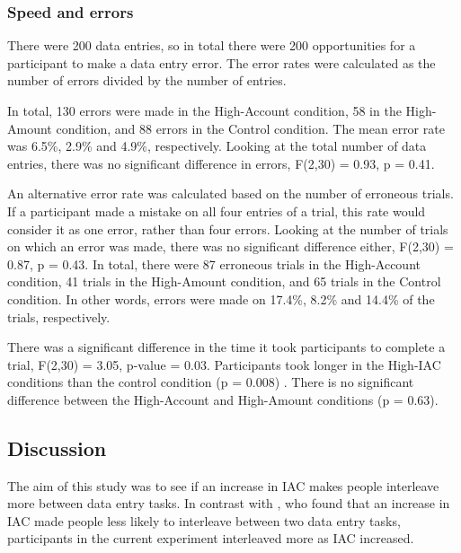\subsubsection{Speed and errors}
There were 200 data entries, so in total there were 200 opportunities for a participant to make a data entry error. The error rates were calculated as the number of errors divided by the number of entries. 

In total, 130 errors were made in the High-Account condition, 58 in the High-Amount condition, and 88 errors in the Control condition. The mean error rate was 6.5\%, 2.9\% and 4.9\%, respectively. 
Looking at the total number of data entries, there was no significant difference in errors, F(2,30) = 0.93, p = 0.41.

An alternative error rate was calculated based on the number of erroneous trials. If a participant made a mistake on all four entries of a trial, this rate would consider it as one error, rather than four errors. Looking at the number of trials on which an error was made, there was no significant difference either, F(2,30) = 0.87, p = 0.43. In total, there were 87 erroneous trials in the High-Account condition, 41 trials in the High-Amount condition, and 65 trials in the Control condition. In other words, errors were made on 17.4\%, 8.2\% and 14.4\% of the trials, respectively. 

There was a significant difference in the time it took participants to complete a trial, F(2,30) = 3.05, p-value = 0.03. Participants took longer in the High-IAC conditions than the control condition  (p = 0.008) . There is no significant difference between the High-Account and High-Amount conditions (p = 0.63).

\subsection{Discussion}
The aim of this study was to see if an increase in IAC makes people interleave more between data entry tasks. In contrast with \citet{Back2012}, who found that an increase in IAC made people less likely to interleave between two data entry tasks, participants in the current experiment interleaved more as IAC increased.

